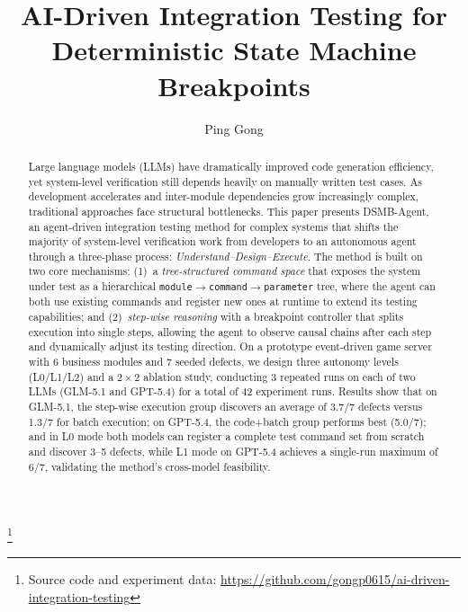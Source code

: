 \documentclass[sigconf,nonacm]{acmart}
\begin{document}
\title{AI-Driven Integration Testing for Deterministic State Machine Breakpoints}

\author{Ping Gong}
\thanks{Source code and experiment data: \url{https://github.com/gongp0615/ai-driven-integration-testing}}

\begin{abstract}
Large language models (LLMs) have dramatically improved code generation efficiency, yet system-level verification still depends heavily on manually written test cases. As development accelerates and inter-module dependencies grow increasingly complex, traditional approaches face structural bottlenecks. This paper presents DSMB-Agent, an agent-driven integration testing method for complex systems that shifts the majority of system-level verification work from developers to an autonomous agent through a three-phase process: \emph{Understand--Design--Execute}. The method is built on two core mechanisms: (1)~a \emph{tree-structured command space} that exposes the system under test as a hierarchical \texttt{module$\to$command$\to$parameter} tree, where the agent can both use existing commands and register new ones at runtime to extend its testing capabilities; and (2)~\emph{step-wise reasoning} with a breakpoint controller that splits execution into single steps, allowing the agent to observe causal chains after each step and dynamically adjust its testing direction. On a prototype event-driven game server with 6 business modules and 7 seeded defects, we design three autonomy levels (L0/L1/L2) and a $2\times2$ ablation study, conducting 3 repeated runs on each of two LLMs (GLM-5.1 and GPT-5.4) for a total of 42 experiment runs. Results show that on GLM-5.1, the step-wise execution group discovers an average of 3.7/7 defects versus 1.3/7 for batch execution; on GPT-5.4, the code+batch group performs best (5.0/7); and in L0 mode both models can register a complete test command set from scratch and discover 3--5 defects, while L1 mode on GPT-5.4 achieves a single-run maximum of 6/7, validating the method's cross-model feasibility.
\end{abstract}


\maketitle
\end{document}

